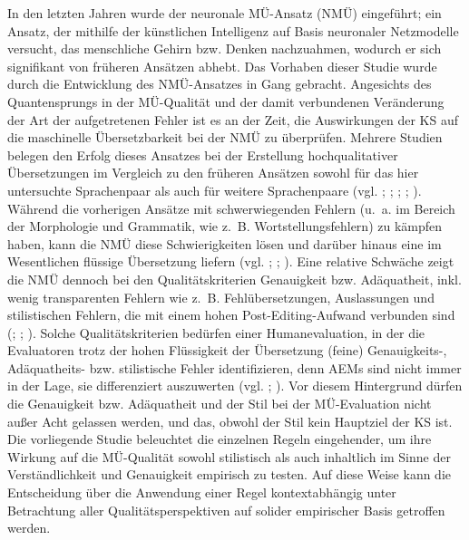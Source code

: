 In den letzten Jahren wurde der neuronale MÜ-Ansatz (NMÜ) eingeführt; ein Ansatz, der mithilfe der künstlichen Intelligenz auf Basis neuronaler Netzmodelle versucht, das menschliche Gehirn bzw. Denken nachzuahmen, wodurch er sich signifikant von früheren Ansätzen abhebt. Das Vorhaben dieser Studie wurde durch die Entwicklung des NMÜ-Ansatzes in Gang gebracht. Angesichts des Quantensprungs in der MÜ-Qualität und der damit verbundenen Veränderung der Art der aufgetretenen Fehler ist es an der Zeit, die Auswirkungen der KS auf die maschinelle Übersetzbarkeit bei der NMÜ zu überprüfen. Mehrere Studien belegen den Erfolg dieses Ansatzes bei der Erstellung hochqualitativer Übersetzungen im Vergleich zu den früheren Ansätzen sowohl für das hier untersuchte Sprachenpaar als auch für weitere Sprachenpaare (vgl. \citealt{BentivogliEtAl2016}; \citealt{WuEtAl2016}; \citealt{CastilhoEtAl2017b}; \citealt{ToralSanchez-Cartagena2017}; \citealt{Popović2018}). Während die vorherigen Ansätze mit schwerwiegenden Fehlern (u.~a. im Bereich der Morphologie und Grammatik, wie z.~B. Wortstellungsfehlern) zu kämpfen haben, kann die NMÜ diese Schwierigkeiten lösen und darüber hinaus eine im Wesentlichen flüssige Übersetzung liefern (vgl. \citealt{BentivogliEtAl2016}; \citealt{ToralSanchez-Cartagena2017}; \citealt{VanBrusselEtAl2018}). Eine relative Schwäche zeigt die NMÜ dennoch bei den Qualitätskriterien Genauigkeit bzw. Adäquatheit, inkl. wenig transparenten Fehlern wie z.~B. Fehlübersetzungen, Auslassungen und stilistischen Fehlern, die mit einem hohen Post-Editing-Aufwand verbunden sind (\citealt{VanBrusselEtAl2018}; \citealt{Volk2018}; \citealt{VardaroEtAl2019}). Solche Qualitätskriterien bedürfen einer Humanevaluation, in der die Evaluatoren trotz der hohen Flüssigkeit der Übersetzung (feine) Genauigkeits-, Adäquatheits- bzw. stilistische Fehler identifizieren, denn AEMs sind nicht immer in der Lage, sie differenziert auszuwerten (vgl. \citealt{MüllerEtAl2018}; \citealt{ShterionovEtAl2018}). Vor diesem Hintergrund dürfen die Genauigkeit bzw. Adäquatheit und der Stil bei der MÜ-Evaluation nicht außer Acht gelassen werden, und das, obwohl der Stil kein Hauptziel der KS ist. Die vorliegende Studie beleuchtet die einzelnen Regeln eingehender, um ihre Wirkung auf die MÜ-Qualität sowohl stilistisch als auch inhaltlich im Sinne der Verständlichkeit und Genauigkeit empirisch zu testen. Auf diese Weise kann die Entscheidung über die Anwendung einer Regel kontextabhängig unter Betrachtung aller Qualitätsperspektiven auf solider empirischer Basis getroffen werden.

